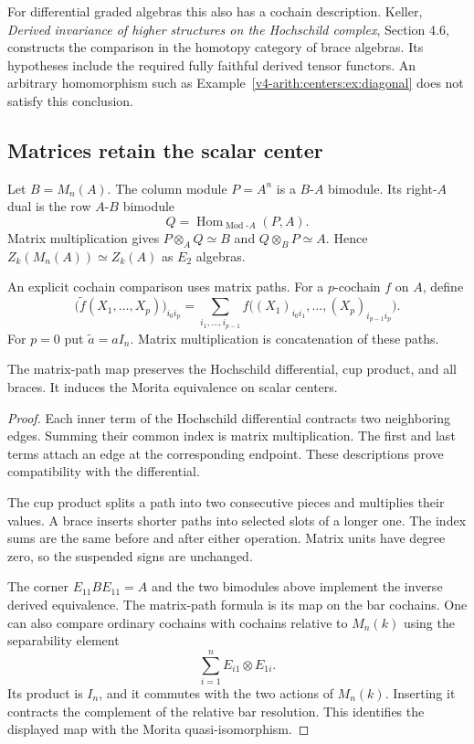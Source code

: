 For differential graded algebras this also has a
cochain description. Keller,
\emph{Derived invariance of higher structures on the
Hochschild complex}, Section 4.6, constructs the
comparison in the homotopy category of brace algebras.
Its hypotheses include the required fully faithful
derived tensor functors. An arbitrary homomorphism
such as Example~\ref{v4-arith:centers:ex:diagonal}
does not satisfy this conclusion.

\subsection{Matrices retain the scalar center}

Let $B=M_n(A)$. The column module $P=A^n$ is a $B$-$A$ bimodule.
Its right-$A$ dual is the row $A$-$B$ bimodule
\[
 Q=\operatorname{Hom}_{\operatorname{Mod}\text{-}A}(P,A).
\] Matrix multiplication gives
$P\otimes_AQ\simeq B$ and $Q\otimes_BP\simeq A$.
Hence $Z_k(M_n(A))\simeq Z_k(A)$ as $E_2$ algebras.

An explicit cochain comparison uses matrix paths.
For a $p$-cochain $f$ on $A$, define
\begin{equation}\label{v4-arith:centers:eq:matrix-path}
 \bigl(\widetilde f(X_1,\ldots,X_p)\bigr)_{i_0i_p}
 =\sum_{i_1,\ldots,i_{p-1}}
 f\bigl((X_1)_{i_0i_1},\ldots,(X_p)_{i_{p-1}i_p}\bigr).
\end{equation}
For $p=0$ put $\widetilde a=aI_n$.
Matrix multiplication is concatenation of these paths.

\begin{proposition}\label{v4-arith:centers:prop:matrix-path}
The matrix-path map preserves the Hochschild
differential, cup product, and all braces. It induces
the Morita equivalence on scalar centers.
\end{proposition}

\begin{proof}
Each inner term of the Hochschild differential
contracts two neighboring edges. Summing their common
index is matrix multiplication. The first and last
terms attach an edge at the corresponding endpoint.
These descriptions prove compatibility with the
differential.

The cup product splits a path into two consecutive
pieces and multiplies their values. A brace inserts
shorter paths into selected slots of a longer one.
The index sums are the same before and after either
operation. Matrix units have degree zero, so the
suspended signs are unchanged.

The corner $E_{11}BE_{11}=A$ and the two bimodules
above implement the inverse derived equivalence.
The matrix-path formula is its map on the bar
cochains. One can also compare ordinary cochains with
cochains relative to $M_n(k)$ using the separability
element
\[
 \sum_{i=1}^n E_{i1}\otimes E_{1i}.
\]
Its product is $I_n$, and it commutes with the two
actions of $M_n(k)$. Inserting it contracts the
complement of the relative bar resolution. This
identifies the displayed map with the Morita
quasi-isomorphism.
\end{proof}

